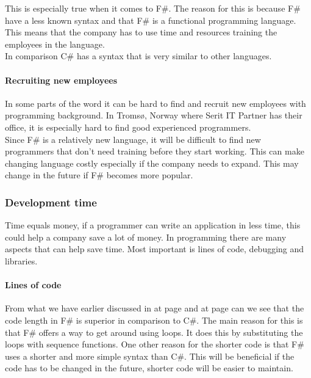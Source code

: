 \documentclass[12pt, a4paper]{article}
\begin{document}
This is especially true when it comes to F\#. The reason for this is because F\# have a less known syntax and that F\# is a functional programming language. This means that the company has to use time and resources training the employees in the language.\\

In comparison C\# has a syntax that is very similar to other languages.

\paragraph{Recruiting new employees}
In some parts of the word it can be hard to find and recruit new employees with programming background. In Tromsø, Norway where Serit IT Partner has their office, it is especially hard to find good experienced programmers.\\

Since F\# is a relatively new language, it will be difficult to find new programmers that don't need training before they start working. This can make changing language costly especially if the company needs to expand. This may change in the future if F\# becomes more popular.

\newpage
\subsubsection{Development time}
\label{developmentTime}
Time equals money, if a programmer can write an application in less time, this could help a company save a lot of money. In programming there are many aspects that can help save time. Most important is lines of code, debugging and libraries. 

\paragraph{Lines of code}

From what we have earlier discussed in  at page \pageref{linesOfCode} and  at page \pageref{Testimonials} can we see that the code length in F\# is superior in comparison to C\#. The main reason for this is that F\# offers a way to get around using loops. It does this by substituting the loops with sequence functions. One other reason for the shorter code is that F\# uses a shorter and more simple syntax than C\#. This will be beneficial if the code has to be changed in the future, shorter code will be easier to maintain.
\end{document}
